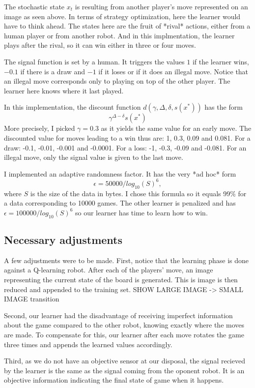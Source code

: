 \documentclass[letterpaper, 10.5 pt, conference]{ieeeconf}
\begin{document}
The stochastic state $x_t$ is resulting from another player's move represented on an image as seen above. In terms of strategy optimization, here the learner would have to think ahead. The states here are the fruit of *rival* actions, either from a human player or from another robot. And in this implmentation, the learner plays after the rival, so it can win either in three or four moves.

The signal function is set by a human. It triggers the values $1$ if the learner wins, $-0.1$ if there is a draw and $-1$ if it loses or if it does an illegal move. Notice that an illegal move corresponds only to playing on top of the other player. The learner here knows where it last played.

In this implementation, the discount function $d(\gamma, \Delta, \delta, s(x^*))$ has the form
$$\gamma^{\Delta-\delta}s(x^*)$$
More precisely, I picked $\gamma=0.3$ as it yields the same value for an early move. The discounted value for moves leading to a win thus are: 1, 0.3, 0.09 and 0.081. For a draw: -0.1, -0.01, -0.001 and -0.0001. For a loss: -1, -0.3, -0.09 and -0.081. For an illegal move, only the signal value is given to the last move.

I implemented an adaptive randomness factor. It has the very *ad hoc* form 
$$\epsilon = 50000/log_{10}(S)^6,$$
where $S$ is the size of the data in bytes. I chose this formula so it equals 99\% for a data corresponding to 10000 games. The other learner is penalized and has $\epsilon = 100000/log_{10}(S)^6$ so our learner has time to learn how to win.

\subsection{Necessary adjustments}

A few adjustments were to be made. First, notice that the learning phase is done against a Q-learning robot. After each of the players' move, an image representing the current state of the board is generated. This is image is then reduced and appended to the training set.
SHOW LARGE IMAGE -> SMALL IMAGE transition

Second, our learner had the disadvantage of receiving imperfect information about the game compared to the other robot, knowing exactly where the moves are made. To compensate for this, our learner after each move rotates the game three times and appends the learned values accordingly.

Third, as we do not have an objective sensor at our disposal, the signal recieved by the learner is the same as the signal coming from the oponent robot. It is an objective information indicating the final state of game when it happens.
\end{document}
